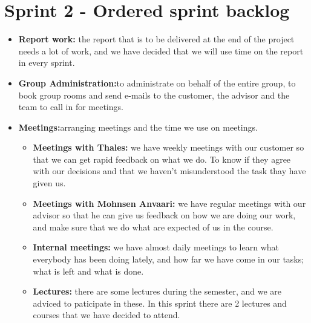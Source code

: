 \section{Sprint 2 - Ordered sprint backlog}

\begin{itemize}
\item{}\textbf{Report work:} the report that is to be delivered at the end of the project needs a lot of work, and we have decided that we will use time on the report in every sprint.
\item{}\textbf{Group Administration:}to administrate on behalf of the entire group, to book group rooms and send e-mails to the customer, the advisor and the team to call in for meetings.
\item{}\textbf{Meetings:}arranging meetings and the time we use on meetings.
\begin{itemize}
\item{}\textbf{Meetings with Thales:} we have weekly meetings with our customer so that we can get rapid feedback on what we do. To know if they agree with our decisions and that we haven't misunderstood the task thay have given us.
\item{}\textbf{Meetings with Mohnsen Anvaari:} we have regular meetings with our advisor so that he can give us feedback on how we are doing our work, and make sure that we do what are expected of us in the course.
\item{}\textbf{Internal meetings:} we have almost daily meetings to learn what everybody has been doing lately, and how far we have come in our tasks; what is left and what is done.
\item{}\textbf{Lectures:} there are some lectures during the semester, and we are adviced to paticipate in these. In this sprint there are 2 lectures and courses that we have decided to attend.
\end{itemize}

\newpage


\end{itemize}
